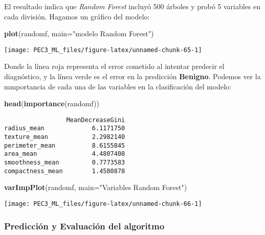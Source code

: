 \documentclass[
]{article}
\newenvironment{Shaded}{\begin{snugshade}}{\end{snugshade}}
\newcommand{\DataTypeTok}[1]{\textcolor[rgb]{0.13,0.29,0.53}{#1}}
\newcommand{\KeywordTok}[1]{\textcolor[rgb]{0.13,0.29,0.53}{\textbf{#1}}}
\newcommand{\NormalTok}[1]{#1}
\newcommand{\StringTok}[1]{\textcolor[rgb]{0.31,0.60,0.02}{#1}}
\begin{document}
El resultado indica que \emph{Random Forest} incluyó 500 árboles y probó
5 variables en cada división. Hagamos un gráfico del modelo:

\begin{Shaded}
\begin{Highlighting}[]
\KeywordTok{plot}\NormalTok{(randomf, }\DataTypeTok{main=}\StringTok{"modelo Random Forest"}\NormalTok{)}
\end{Highlighting}
\end{Shaded}

\begin{center}\texttt{[image: PEC3\_ML\_files/figure-latex/unnamed-chunk-65-1]} \end{center}

Donde la línea roja representa el error cometido al intentar predecir el
diagnóstico, y la línea verde es el error en la predicción
\textbf{Benigno}. Podemos ver la mmportancia de cada una de las
variables en la clasificación del modelo:

\begin{Shaded}
\begin{Highlighting}[]
\KeywordTok{head}\NormalTok{(}\KeywordTok{importance}\NormalTok{(randomf))}
\end{Highlighting}
\end{Shaded}

\begin{verbatim}
                 MeanDecreaseGini
radius_mean             6.1171750
texture_mean            2.2982140
perimeter_mean          8.6155845
area_mean               4.4807408
smoothness_mean         0.7773583
compactness_mean        1.4580878
\end{verbatim}

\begin{Shaded}
\begin{Highlighting}[]
\KeywordTok{varImpPlot}\NormalTok{(randomf, }\DataTypeTok{main=}\StringTok{"Variables Random Forest"}\NormalTok{)}
\end{Highlighting}
\end{Shaded}

\begin{center}\texttt{[image: PEC3\_ML\_files/figure-latex/unnamed-chunk-66-1]} \end{center}

\hypertarget{predicciuxf3n-y-evaluaciuxf3n-del-algoritmo-4}{%
\subsubsection{Predicción y Evaluación del
algoritmo}\label{predicciuxf3n-y-evaluaciuxf3n-del-algoritmo-4}}
\end{document}
